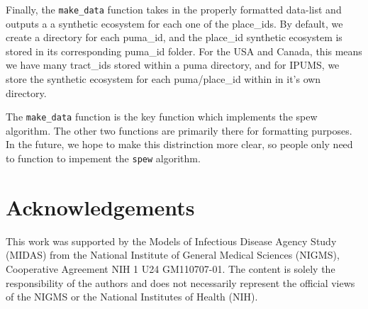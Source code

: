 \documentclass{article}
\begin{document}
Finally, the \verb|make_data| function takes in the properly formatted data-list and outputs a a synthetic ecosystem for each one of the place\_ids. By default, we create a directory for each puma\_id, and the place\_id synthetic ecosystem is stored in its corresponding puma\_id folder. For the USA and Canada, this means we have many tract\_ids stored within a puma directory, and for IPUMS, we store the synthetic ecosystem for each puma/place\_id within in it's own directory. 

The \verb|make_data| function is the key function which implements the spew algorithm. The other two functions are primarily there for formatting purposes. In the future, we hope to make this distrinction more clear, so people only need to function to impement the \verb|spew| algorithm. 

\newpage 
\section{Acknowledgements}
This work was supported by the Models of Infectious Disease Agency Study (MIDAS) from the National Institute of General Medical Sciences (NIGMS), Cooperative Agreement NIH 1 U24 GM110707-01. The content is solely the responsibility of the authors and does not necessarily represent the official views of the NIGMS or the National Institutes of Health (NIH).
\end{document}
